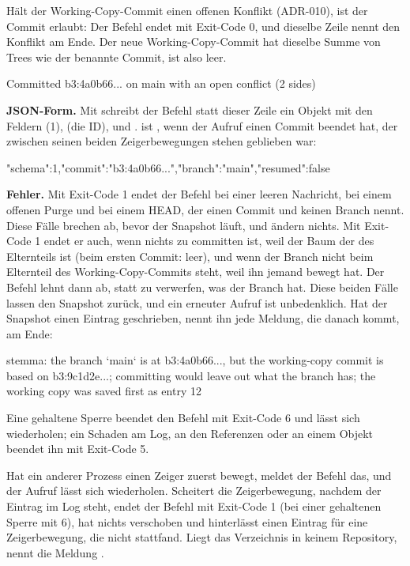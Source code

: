 Hält der Working-Copy-Commit einen offenen Konflikt (ADR-010), ist der Commit erlaubt:
Der Befehl endet mit Exit-Code 0, und dieselbe Zeile nennt den Konflikt am Ende.
Der neue Working-Copy-Commit hat dieselbe Summe von Trees wie der benannte Commit, ist also leer.

\starttyping
Committed b3:4a0b66... on main with an open conflict (2 sides)
\stoptyping

{\bf JSON-Form.} Mit  schreibt der Befehl statt dieser Zeile ein Objekt mit den
Feldern  (1),  (die ID),  und .
 ist , wenn der Aufruf einen Commit beendet hat, der zwischen seinen
beiden Zeigerbewegungen stehen geblieben war:

\starttyping
{"schema":1,"commit":"b3:4a0b66...","branch":"main","resumed":false}
\stoptyping

{\bf Fehler.} Mit Exit-Code 1 endet der Befehl bei einer leeren Nachricht, bei einem offenen Purge
und bei einem HEAD, der einen Commit und keinen Branch nennt.
Diese Fälle brechen ab, bevor der Snapshot läuft, und ändern nichts.
Mit Exit-Code 1 endet er auch, wenn nichts zu committen ist, weil der Baum der des Elternteils ist
(beim ersten Commit: leer), und wenn der Branch nicht beim Elternteil des Working-Copy-Commits
steht, weil ihn jemand bewegt hat. Der Befehl lehnt dann ab, statt zu verwerfen, was der Branch hat.
Diese beiden Fälle lassen den Snapshot zurück, und ein erneuter
Aufruf ist unbedenklich.
Hat der Snapshot einen Eintrag geschrieben, nennt ihn jede Meldung, die danach kommt, am Ende:

\starttyping
stemma: the branch `main` is at b3:4a0b66..., but the working-copy commit is based on
b3:9c1d2e...; committing would leave out what the branch has; the working copy was saved
first as entry 12
\stoptyping

Eine gehaltene Sperre beendet den Befehl mit Exit-Code 6 und lässt sich wiederholen;
ein Schaden am Log, an den Referenzen oder an einem Objekt beendet ihn mit Exit-Code 5.

Hat ein anderer Prozess einen Zeiger zuerst bewegt, meldet der Befehl das,
und der Aufruf lässt sich wiederholen. Scheitert die Zeigerbewegung, nachdem der Eintrag im Log
steht, endet der Befehl mit Exit-Code 1 (bei einer gehaltenen Sperre mit 6), hat nichts
verschoben und hinterlässt einen Eintrag für eine Zeigerbewegung, die nicht stattfand.
Liegt das Verzeichnis in keinem Repository, nennt die Meldung .


